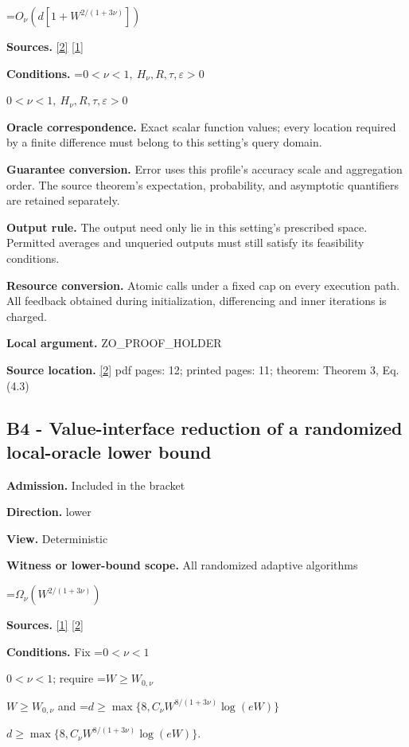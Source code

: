 \documentclass[10pt,a4paper]{article}
\newcommand{\AtlasMath}[1]{\par\begingroup\centering\setbox0=\hbox{$\displaystyle #1$}\ifdim\wd0>1.4\linewidth\typeout{ATLAS WIDE FORMULA: \the\wd0}\fi\ifdim\wd0>\linewidth\resizebox{\linewidth}{!}{\box0}\else\box0\fi\par\endgroup}
\newcommand{\AtlasInlineMath}[1]{\begingroup\setbox0=\hbox{$#1$}\ifdim\wd0>.4\linewidth\endgroup\AtlasMath{#1}\else\endgroup$#1$\fi}
\begin{document}
\AtlasMath{O_\nu(d[1+W^{2/(1+3\nu)}])}
\textbf{Sources.} \href{https://optimization-online.org/wp-content/uploads/2013/04/3833.pdf}{[2]} \href{https://proceedings.mlr.press/v99/diakonikolas19c/diakonikolas19c.pdf}{[1]}

\textbf{Conditions.} \AtlasInlineMath{0<\nu<1,\ H_\nu,R,\tau,\varepsilon>0}

\textbf{Oracle correspondence.} Exact scalar function values; every location required by a finite difference must belong to this setting's query domain.

\textbf{Guarantee conversion.} Error uses this profile's accuracy scale and aggregation order. The source theorem's expectation, probability, and asymptotic quantifiers are retained separately.

\textbf{Output rule.} The output need only lie in this setting's prescribed space. Permitted averages and unqueried outputs must still satisfy its feasibility conditions.

\textbf{Resource conversion.} Atomic calls under a fixed cap on every execution path. All feedback obtained during initialization, differencing and inner iterations is charged.

\textbf{Local argument.} ZO\_\allowbreak{}PROOF\_\allowbreak{}HOLDER

\textbf{Source location.} \href{https://optimization-online.org/wp-content/uploads/2013/04/3833.pdf}{[2]} pdf pages: 12; printed pages: 11; theorem: Theorem 3, Eq.(4.3)

\subsection{B4 - Value-interface reduction of a randomized local-oracle lower bound}
\textbf{Admission.} Included in the bracket

\textbf{Direction.} lower

\textbf{View.} Deterministic

\textbf{Witness or lower-bound scope.} All randomized adaptive algorithms

\AtlasMath{\Omega_\nu(W^{2/(1+3\nu)})}
\textbf{Sources.} \href{https://proceedings.mlr.press/v99/diakonikolas19c/diakonikolas19c.pdf}{[1]} \href{https://optimization-online.org/wp-content/uploads/2013/04/3833.pdf}{[2]}

\textbf{Conditions.} Fix \AtlasInlineMath{0<\nu<1}; require \AtlasInlineMath{W\ge W_{0,\nu}} and \AtlasInlineMath{d\ge\max\{8,C_\nu W^{8/(1+3\nu)}\log(eW)\}}.
\end{document}
